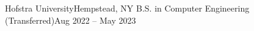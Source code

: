 \resumeSubheading
    {Hofstra University}{Hempstead, NY}
    {B.S. in Computer Engineering (Transferred)}{Aug 2022 -- May 2023}
    \resumeItemListStart
    \resumeItemListEnd
